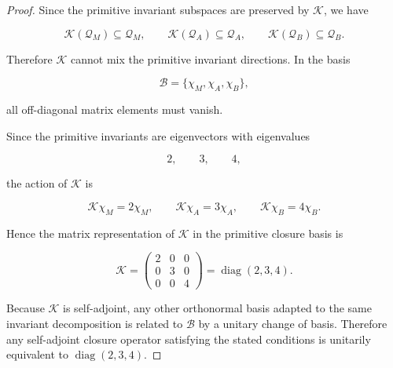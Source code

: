 \documentclass[11pt]{article}
\theoremstyle{definition}
\theoremstyle{remark}
\begin{document}
\begin{proof}

Since the primitive invariant subspaces are preserved by
\(\mathcal K\), we have

\begin{equation}
\mathcal K(\mathcal Q_M)\subseteq \mathcal Q_M,
\qquad
\mathcal K(\mathcal Q_A)\subseteq \mathcal Q_A,
\qquad
\mathcal K(\mathcal Q_B)\subseteq \mathcal Q_B.
\end{equation}

Therefore \(\mathcal K\) cannot mix the primitive invariant
directions. In the basis

\begin{equation}
\mathcal B
=
\{\chi_M,\chi_A,\chi_B\},
\end{equation}

all off-diagonal matrix elements must vanish.

Since the primitive invariants are eigenvectors with eigenvalues

\begin{equation}
2,
\qquad
3,
\qquad
4,
\end{equation}

the action of \(\mathcal K\) is

\begin{equation}
\mathcal K\chi_M=2\chi_M,
\qquad
\mathcal K\chi_A=3\chi_A,
\qquad
\mathcal K\chi_B=4\chi_B.
\end{equation}

Hence the matrix representation of \(\mathcal K\) in the
primitive closure basis is

\begin{equation}
\mathcal K
=
\begin{pmatrix}
2 & 0 & 0\\
0 & 3 & 0\\
0 & 0 & 4
\end{pmatrix}
=
\operatorname{diag}(2,3,4).
\end{equation}

Because \(\mathcal K\) is self-adjoint, any other orthonormal
basis adapted to the same invariant decomposition is related to
\(\mathcal B\) by a unitary change of basis. Therefore any
self-adjoint closure operator satisfying the stated conditions
is unitarily equivalent to
\(\operatorname{diag}(2,3,4)\).

\end{proof}

\end{document}
